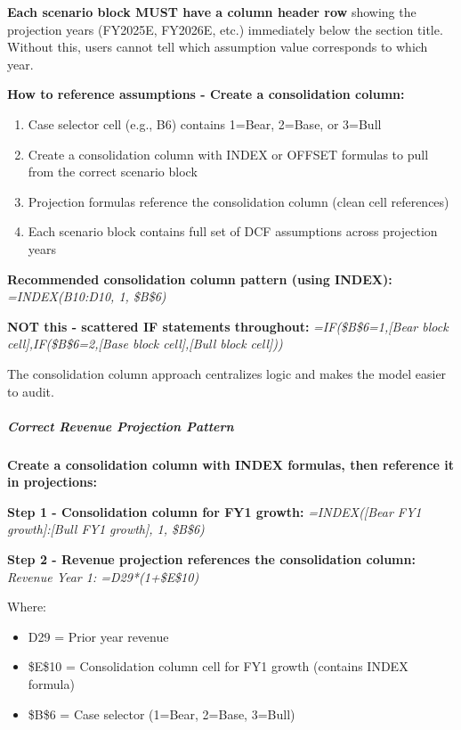 \documentclass[11pt]{article}
\begin{document}
\textbf{Each scenario block MUST have a column header row} showing the projection years (FY2025E, FY2026E, etc.) immediately below the section title. Without this, users cannot tell which assumption value corresponds to which year.


\textbf{How to reference assumptions - Create a consolidation column:}

\begin{enumerate}[leftmargin=*,itemsep=2pt,topsep=2pt]
\item {} Case selector cell (e.g., B6) contains 1=Bear, 2=Base, or 3=Bull
\item {} Create a consolidation column with INDEX or OFFSET formulas to pull from the correct scenario block
\item {} Projection formulas reference the consolidation column (clean cell references)
\item {} Each scenario block contains full set of DCF assumptions across projection years
\end{enumerate}

\textbf{Recommended consolidation column pattern (using INDEX):} \emph{=INDEX(B10:D10, 1, \$B\$6)}


\textbf{NOT this - scattered IF statements throughout:} \emph{=IF(\$B\$6=1,[Bear block cell],IF(\$B\$6=2,[Base block cell],[Bull block cell]))}


The consolidation column approach centralizes logic and makes the model easier to audit.


\subparagraph{Correct Revenue Projection Pattern}\mbox{}\par

\textbf{Create a consolidation column with INDEX formulas, then reference it in projections:}


\textbf{Step 1 - Consolidation column for FY1 growth:} \emph{=INDEX([Bear FY1 growth]:[Bull FY1 growth], 1, \$B\$6)}


\textbf{Step 2 - Revenue projection references the consolidation column:} \emph{Revenue Year 1: =D29*(1+\$E\$10)}


Where:

\begin{itemize}[leftmargin=*,itemsep=2pt,topsep=2pt]
\item {} D29 = Prior year revenue
\item {} \$E\$10 = Consolidation column cell for FY1 growth (contains INDEX formula)
\item {} \$B\$6 = Case selector (1=Bear, 2=Base, 3=Bull)
\end{itemize}
\end{document}
